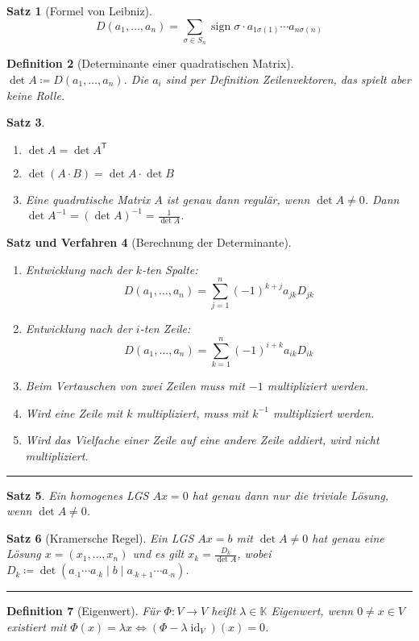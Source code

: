 \documentclass[a4paper]{article}
\newcounter{Sec}
\theoremstyle{marginbreak}
\newtheorem{definition}{Definition}[Sec]
\newtheorem{satz}[definition]{Satz}
\newtheorem{satzver}[definition]{Satz und Verfahren}
\DeclareMathOperator{\id}{id}
\DeclareMathOperator{\sign}{sign}
\newcommand{\sep}{%
	\rule{\textwidth}{0.3pt}%
	\stepcounter{Sec}%
	}
\newcommand\transpose[1]{#1^{\mathsf{T}}}
\begin{document}
	\begin{satz}[Formel von Leibniz]
		\[ D(a_1,\ldots,a_n) = \sum_{\sigma\in S_n}\sign\sigma\cdot a_{1\sigma(1)}\cdots a_{n\sigma(n)} \]
	\end{satz}
	\begin{definition}[Determinante einer quadratischen Matrix]
		$\det A\coloneqq D(a_1,\ldots,a_n)$. Die $a_i$ sind per Definition Zeilenvektoren, das spielt aber keine Rolle.
	\end{definition}
	\begin{satz}
		\begin{enumerate}[label=(\alph*)]
			\item $\det A = \det \transpose{A}$
			\item $\det(A\cdot B) = \det A\cdot \det B$
			\item Eine quadratische Matrix $A$ ist genau dann regulär, wenn $\det A\neq 0$. Dann $\det A^{-1} = (\det A)^{-1} = \frac{1}{\det A}$.
		\end{enumerate}
	\end{satz}
	\begin{satzver}[Berechnung der Determinante]
		\begin{enumerate}[label=(\alph*)]
			\item Entwicklung nach der $k$-ten Spalte:
				\[ D(a_1,\ldots,a_n) = \sum_{j=1}^n(-1)^{k+j}a_{jk}D_{jk} \]
			\item Entwicklung nach der $i$-ten Zeile:
				\[ D(a_1,\ldots,a_n) = \sum_{k=1}^n(-1)^{i+k}a_{ik}D_{ik} \]
			\item Beim Vertauschen von zwei Zeilen muss mit $-1$ multipliziert werden.
			\item Wird eine Zeile mit $k$ multipliziert, muss mit $k^{-1}$ multipliziert werden.
			\item Wird das Vielfache einer Zeile auf eine andere Zeile addiert, wird nicht multipliziert.
		\end{enumerate}
	\end{satzver}
	\sep
	\begin{satz}
		Ein homogenes LGS $Ax=0$ hat genau dann nur die triviale Lösung, wenn $\det A\neq0$.
	\end{satz}
	\begin{satz}[Kramersche Regel]
		Ein LGS $Ax=b$ mit $\det A\neq 0$ hat genau eine Lösung $x = (x_1,\ldots,x_n)$ und es gilt
		$x_k = \frac{D_k}{\det A}$, wobei $D_k\coloneqq\det(a_{\cdot1}\cdots a_{\cdot k} \mid b \mid a_{\cdot k+1}\cdots a_{\cdot n})$.
	\end{satz}
	\sep
	\begin{definition}[Eigenwert]
		Für $\Phi\colon V\to V$ heißt $\lambda\in\mathbb{K}$ Eigenwert, wenn $0\neq x\in V$
		existiert mit $\Phi(x)=\lambda x \iff (\Phi-\lambda\id_V)(x)=0$.
	\end{definition}
\end{document}
